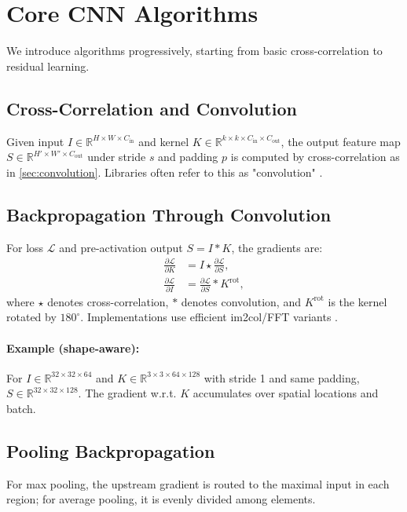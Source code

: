 
\section{Core CNN Algorithms }
\label{sec:cnn-algorithms}

We introduce algorithms progressively, starting from basic cross-correlation to residual learning.

\subsection{Cross-Correlation and Convolution}
Given input $I\in\mathbb{R}^{H\times W\times C_{\text{in}}}$ and kernel $K\in\mathbb{R}^{k\times k\times C_{\text{in}}\times C_{\text{out}}}$, the output feature map $S\in\mathbb{R}^{H'\times W'\times C_{\text{out}}}$ under stride $s$ and padding $p$ is computed by cross-correlation as in \cref{sec:convolution}. Libraries often refer to this as "convolution" \cite{GoodfellowEtAl2016}.

\subsection{Backpropagation Through Convolution}
For loss $\mathcal{L}$ and pre-activation output $S = I * K$, the gradients are:
\begin{align}
\frac{\partial \mathcal{L}}{\partial K} &= I \star \frac{\partial \mathcal{L}}{\partial S},\\
\frac{\partial \mathcal{L}}{\partial I} &= \frac{\partial \mathcal{L}}{\partial S} * K^\text{rot},
\end{align}
where $\star$ denotes cross-correlation, $*$ denotes convolution, and $K^\text{rot}$ is the kernel rotated by $180^{\circ}$. Implementations use efficient im2col/FFT variants \cite{GoodfellowEtAl2016}.

\paragraph{Example (shape-aware):} For $I\in\mathbb{R}^{32\times32\times 64}$ and $K\in\mathbb{R}^{3\times3\times64\times128}$ with stride 1 and same padding, $S\in\mathbb{R}^{32\times32\times128}$. The gradient w.r.t. $K$ accumulates over spatial locations and batch.

\subsection{Pooling Backpropagation}
For max pooling, the upstream gradient is routed to the maximal input in each region; for average pooling, it is evenly divided among elements.

